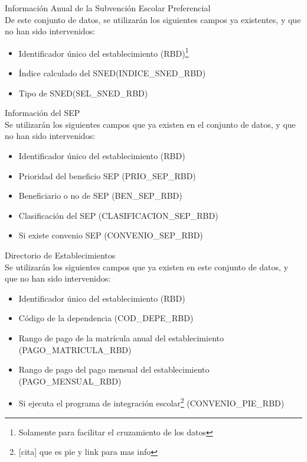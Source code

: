 \begin{longdescription}
        \item[Información Anual de la Subvención Escolar Preferencial] \hfill \\
         De este conjunto de datos, se utilizarán los siguientes campos ya existentes, y que no han sido intervenidos:
            \begin{itemize}
                \item Identificador único del establecimiento (RBD)\footnote{Solamente para facilitar el cruzamiento de los datos}
                \item Índice calculado del SNED(INDICE\_SNED\_RBD)
                \item Tipo de SNED(SEL\_SNED\_RBD)
            \end{itemize}
        \item[Información del SEP] \hfill \\
        Se utilizarán los siguientes campos que ya existen en el conjunto de datos, y que no han sido intervenidos:
            \begin{itemize}
              \item Identificador único del establecimiento (RBD)
              \item Prioridad del beneficio SEP (PRIO\_SEP\_RBD)
              \item Beneficiario o no de SEP (BEN\_SEP\_RBD)
              \item Clasificación del SEP (CLASIFICACION\_SEP\_RBD)
              \item Si existe convenio SEP (CONVENIO\_SEP\_RBD)
            \end{itemize}
        \item[Directorio de Establecimientos] \hfill \\
            Se utilizarán los siguientes campos que ya existen en este conjunto de datos, y que no han sido intervenidos:
            \begin{itemize}
              \item Identificador único del establecimiento (RBD)
              \item Código de la dependencia (COD\_DEPE\_RBD)
              \item Rango de pago de la matrícula anual del establecimiento (PAGO\_MATRICULA\_RBD)
              \item Rango de pago del pago mensual del establecimiento (PAGO\_MENSUAL\_RBD)
              \item Si ejecuta el programa de integración escolar\footnote{[cita] que es pie y link para mas info} (CONVENIO\_PIE\_RBD)

\end{itemize}
\end{longdescription}
